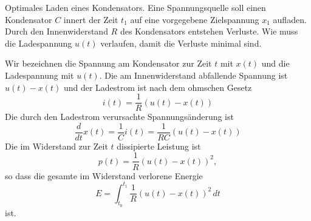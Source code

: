 Optimales Laden eines Kondensators.
Eine Spannungsquelle soll einen Kondensator $C$ innert der Zeit $t_1$
auf eine vorgegebene Zielspannung $x_1$ aufladen.
Durch den Innenwiderstand $R$ des Kondensators entstehen Verluste.
Wie muss die Ladespannung $u(t)$ verlaufen, damit die Verluste minimal
sind.

\begin{loesung}
Wir bezeichnen die Spannung am Kondensator zur Zeit $t$ mit $x(t)$ und
die Ladespannung mit $u(t)$.
Die am Innenwiderstand abfallende Spannung ist $u(t)-x(t)$ und der 
Ladestrom ist nach dem ohmschen Gesetz
\[
i(t) = \frac{1}{R}(u(t)-x(t))
\]
Die durch den Ladestrom verursachte Spannungsänderung ist
\begin{equation}
\frac{d}{dt}x(t) = \frac{1}{C}i(t) = \frac{1}{RC}(u(t)-x(t))
\label{buch:801:systemdgl}
\end{equation}
Die im Widerstand zur Zeit $t$ dissipierte Leistung ist
\[
p(t) = \frac{1}{R}(u(t)-x(t))^2,
\]
so dass die gesamte im Widerstand verlorene Energie
\begin{equation}
E
=
\int_{t_0}^{t_1}
\frac{1}{R}(u(t)-x(t))^2\,dt
\end{equation}
ist.
\end{loesung}


